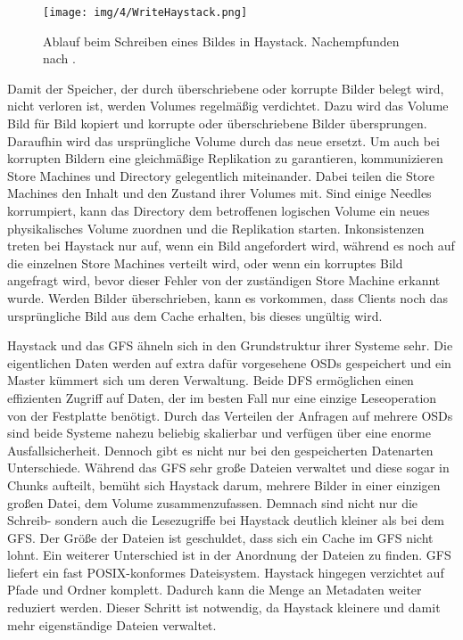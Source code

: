 \documentclass[12pt,oneside,a4paper,parskip]{scrbook}
\begin{document}
\begin{figure}[h]
  \centering
  \texttt{[image: img/4/WriteHaystack.png]}
  \caption[Ablauf beim Schreiben eines Bildes in Haystack.]{ Ablauf beim Schreiben eines Bildes in Haystack. Nachempfunden nach \cite{haystack}.}
  \label{writeHaystack}
\end{figure}

Damit der Speicher, der durch überschriebene oder korrupte Bilder belegt wird, nicht verloren ist, werden Volumes regelmäßig verdichtet. Dazu wird das Volume Bild für Bild kopiert und korrupte oder überschriebene Bilder übersprungen. Daraufhin wird das ursprüngliche Volume durch das neue ersetzt. Um auch bei korrupten Bildern eine gleichmäßige Replikation zu garantieren, kommunizieren Store Machines und Directory gelegentlich miteinander. Dabei teilen die Store Machines den Inhalt und den Zustand ihrer Volumes mit. Sind einige Needles korrumpiert, kann das Directory dem betroffenen logischen Volume ein neues physikalisches Volume zuordnen und die Replikation starten. Inkonsistenzen treten bei Haystack nur auf, wenn ein Bild angefordert wird, während es noch auf die einzelnen Store Machines verteilt wird, oder wenn ein korruptes Bild angefragt wird, bevor dieser Fehler von der zuständigen Store Machine erkannt wurde. Werden Bilder überschrieben, kann es vorkommen, dass Clients noch das ursprüngliche Bild aus dem Cache erhalten, bis dieses ungültig wird.

Haystack und das GFS ähneln sich in den Grundstruktur ihrer Systeme sehr. Die eigentlichen Daten werden auf extra dafür vorgesehene OSDs gespeichert und ein Master kümmert sich um deren Verwaltung. Beide DFS ermöglichen einen effizienten Zugriff auf Daten, der im besten Fall nur eine einzige Leseoperation von der Festplatte benötigt. Durch das Verteilen der Anfragen auf mehrere OSDs sind beide Systeme nahezu beliebig skalierbar und verfügen über eine enorme Ausfallsicherheit. Dennoch gibt es nicht nur bei den gespeicherten Datenarten Unterschiede. Während das GFS sehr große Dateien verwaltet und diese sogar in Chunks aufteilt, bemüht sich Haystack darum, mehrere Bilder in einer einzigen großen Datei, dem Volume zusammenzufassen. Demnach sind nicht nur die Schreib- sondern auch die Lesezugriffe bei Haystack deutlich kleiner als bei dem GFS. Der Größe der Dateien ist geschuldet, dass sich ein Cache im GFS nicht lohnt. Ein weiterer Unterschied ist in der Anordnung der Dateien zu finden. GFS liefert ein fast POSIX-konformes Dateisystem. Haystack hingegen verzichtet auf Pfade und Ordner komplett. Dadurch kann die Menge an Metadaten weiter reduziert werden. Dieser Schritt ist notwendig, da Haystack kleinere und damit mehr eigenständige Dateien verwaltet. 
\end{document}

